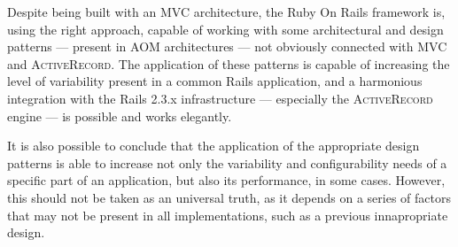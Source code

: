 \documentclass[9pt,a4paper]{extarticle}
\begin{document}
\begin{multicols}{2}
Despite being built with an MVC architecture, the Ruby On Rails framework is, using the right approach, capable of working with some architectural and design patterns --- present in AOM architectures --- not obviously connected with MVC and \textsc{ActiveRecord}. The application of these patterns is capable of increasing the level of variability present in a common Rails application, and a harmonious integration with the Rails 2.3.x infrastructure --- especially the \textsc{ActiveRecord} engine --- is possible and works elegantly.

It is also possible to conclude that the application of the appropriate design patterns is able to increase not only the variability and configurability needs of a specific part of an application, but also its performance, in some cases. However, this should not be taken as an universal truth, as it depends on a series of factors that may not be present in all implementations, such as a previous innapropriate design.



\end{multicols}
\end{document}
